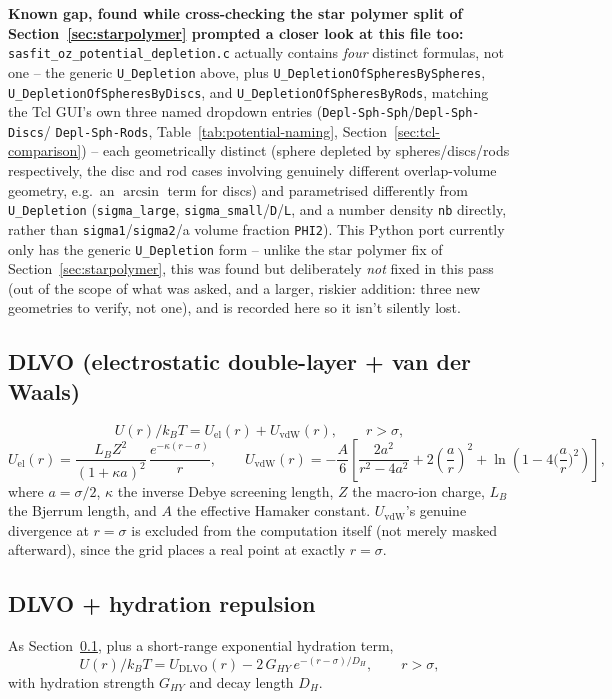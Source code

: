 \documentclass[11pt,a4paper]{article}
\newcommand{\code}[1]{\texttt{#1}}
\begin{document}
\textbf{Known gap, found while cross-checking the star polymer split of
Section~\ref{sec:starpolymer} prompted a closer look at this file too:}
\code{sasfit\_oz\_potential\_depletion.c} actually contains \emph{four}
distinct formulas, not one -- the generic \code{U\_Depletion} above, plus
\code{U\_DepletionOfSpheresBySpheres}, \code{U\_DepletionOfSpheresByDiscs},
and \code{U\_DepletionOfSpheresByRods}, matching the Tcl GUI's own three
named dropdown entries (\code{Depl-Sph-Sph}/\code{Depl-Sph-Discs}/
\code{Depl-Sph-Rods}, Table~\ref{tab:potential-naming},
Section~\ref{sec:tcl-comparison}) -- each geometrically distinct (sphere
depleted by spheres/discs/rods respectively, the disc and rod cases
involving genuinely different overlap-volume geometry, e.g.\ an
$\arcsin$ term for discs) and parametrised differently from
\code{U\_Depletion} (\code{sigma\_large}, \code{sigma\_small}/\code{D}/\code{L},
and a number density \code{nb} directly, rather than
\code{sigma1}/\code{sigma2}/a volume fraction \code{PHI2}). This Python port
currently only has the generic \code{U\_Depletion} form -- unlike the star
polymer fix of Section~\ref{sec:starpolymer}, this was found but
deliberately \emph{not} fixed in this pass (out of the scope of what was
asked, and a larger, riskier addition: three new geometries to verify,
not one), and is recorded here so it isn't silently lost.

\subsection{DLVO (electrostatic double-layer + van der Waals)}
\label{sec:dlvo}
\begin{equation}
  U(r)/k_BT = U_{\mathrm{el}}(r) + U_{\mathrm{vdW}}(r), \qquad r>\sigma,
\end{equation}
\begin{equation}
  U_{\mathrm{el}}(r) = \frac{L_B Z^2}{(1+\kappa a)^2}\,\frac{e^{-\kappa(r-\sigma)}}{r},
  \qquad
  U_{\mathrm{vdW}}(r) = -\frac{A}{6}\left[\frac{2a^2}{r^2-4a^2}+2\left(\frac{a}{r}\right)^2
    +\ln\!\left(1-4\Big(\frac{a}{r}\Big)^2\right)\right],
\end{equation}
where $a=\sigma/2$, $\kappa$ the inverse Debye screening length, $Z$ the
macro-ion charge, $L_B$ the Bjerrum length, and $A$ the effective Hamaker
constant. $U_{\mathrm{vdW}}$'s genuine divergence at $r=\sigma$ is excluded from
the computation itself (not merely masked afterward), since the grid places a
real point at exactly $r=\sigma$.

\subsection{DLVO + hydration repulsion}
As Section~\ref{sec:dlvo}, plus a short-range exponential hydration term,
\begin{equation}
  U(r)/k_BT = U_{\mathrm{DLVO}}(r) - 2\,G_{HY}\,e^{-(r-\sigma)/D_H}, \qquad r>\sigma,
\end{equation}
with hydration strength $G_{HY}$ and decay length $D_H$.
\end{document}
